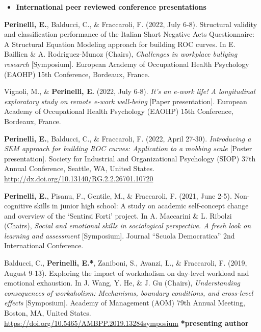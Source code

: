 \documentclass[hidelinks, letterpaper,10pt]{article} %
\begin{document}
\begin{itemize} 
	\setlength{\topsep}{0pt}%
	\setlength{\leftmargin}{0.1in}%
	\setlength{\listparindent}{-0.1in}%
	\setlength{\itemindent}{-0.2in}%
	\setlength{\parsep}{\parskip}%
	
	\item {\textbf{\large{International peer reviewed conference presentations}}}
\end{itemize}
\begin{etaremune}

    \item \textbf{Perinelli, E.}, Balducci, C., \& Fraccaroli, F. (2022, July 6-8). Structural validity and classification performance of the Italian Short Negative Acts Questionnaire: A Structural Equation Modeling approach for building ROC curves. In E. Baillien \& A. Rodriguez-Munoz (Chairs), \textit{Challenges in workplace bullying research} [Symposium]. European Academy of Occupational Health Psychology (EAOHP) 15th Conference, Bordeaux, France.
    
    \item Vignoli, M., \& \textbf{Perinelli, E.} (2022, July 6-8). \textit{It’s an e-work life! A longitudinal exploratory study on remote e-work well-being} [Paper presentation]. European Academy of Occupational Health Psychology (EAOHP) 15th Conference, Bordeaux, France. 

   \item \textbf{Perinelli, E.}, Balducci, C., \& Fraccaroli, F. (2022, April 27-30). \textit{Introducing a SEM approach for building ROC curves: Application to a mobbing scale} [Poster presentation]. Society for Industrial and Organizational Psychology (SIOP) 37th Annual Conference, Seattle, WA, United States. \url{http://dx.doi.org/10.13140/RG.2.2.26701.10720} 

    \item \textbf{Perinelli, E.}, Pisanu, F., Gentile, M., \& Fraccaroli, F. (2021, June 2-5). Non-cognitive skills in junior high school: A study on academic self-concept change and overview of the ‘Sentirsi Forti’ project. In A. Maccarini \& L. Ribolzi (Chairs), \textit{Social and emotional skills in sociological perspective. A fresh look on learning and assessment} [Symposium]. Journal “Scuola Democratica” 2nd International Conference.

    \item Balducci, C., \textbf{Perinelli, E.*}, Zaniboni, S., Avanzi, L., \& Fraccaroli, F. (2019, August 9-13). Exploring the impact of workaholism on day-level workload and emotional exhaustion. In J. Wang, Y. He, \& J. Gu (Chairs), \textit{Understanding consequences of workaholism: Mechanisms, boundary conditions, and cross-level effects} [Symposium]. Academy of Management (AOM) 79th Annual Meeting, Boston, MA, United States. \url{https://doi.org/10.5465/AMBPP.2019.13284symposium}   \textbf{*presenting author}


\end{etaremune}
\end{document}

